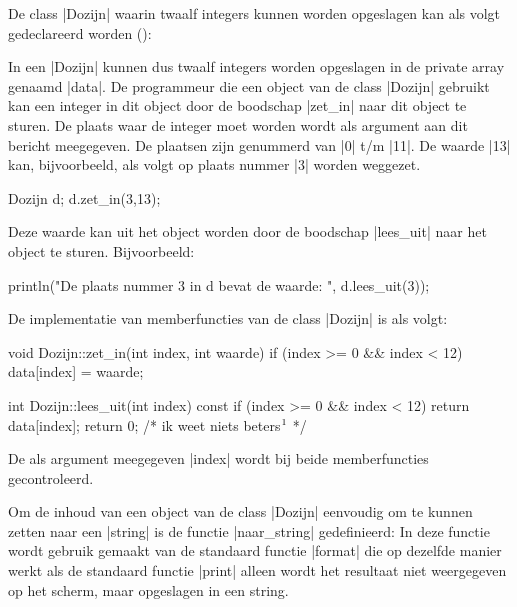 \begin{cpplstShortInline}
De class |Dozijn| waarin twaalf integers kunnen worden opgeslagen kan als volgt gedeclareerd worden ():

In een |Dozijn| kunnen dus twaalf integers worden opgeslagen in de private array genaamd |data|.
De programmeur die een object van de class |Dozijn| gebruikt kan een integer in dit object  door de boodschap |zet_in| naar dit object te sturen.
De plaats waar de integer moet worden  wordt als argument aan dit bericht meegegeven.
De plaatsen zijn genummerd van |0| t/m |11|. 
De waarde |13| kan, bijvoorbeeld, als volgt op plaats nummer |3| worden weggezet.
\begin{cpplstfragment}
    Dozijn d;
    d.zet_in(3,13);
\end{cpplstfragment}

Deze waarde kan uit het object worden  door de boodschap |lees_uit| naar het object te sturen.
Bijvoorbeeld:
\begin{cpplstfragment}
    println("De plaats nummer 3 in d bevat de waarde: {}", d.lees_uit(3));
\end{cpplstfragment}

De implementatie van memberfuncties van de class |Dozijn| is als volgt:
\begin{cpplstfragment}[mathescape=true]
void Dozijn::zet_in(int index, int waarde) {
    if (index >= 0 && index < 12) 
        data[index] = waarde;
}

int Dozijn::lees_uit(int index) const {
    if (index >= 0 && index < 12) 
        return data[index];
    return 0; /* ik weet niets beters$\label{return Dozijn::lees_uit}\footnotemark$ */
}
\end{cpplstfragment}


De als argument meegegeven |index| wordt bij beide memberfuncties gecontroleerd.

Om de inhoud van een object van de class |Dozijn| eenvoudig om te kunnen zetten naar een |string| is de functie |naar_string| gedefinieerd:
In deze functie wordt gebruik gemaakt van de standaard functie |format| die op dezelfde manier werkt als de standaard functie |print| alleen wordt het resultaat niet weergegeven op het scherm, maar opgeslagen in een string.


\end{cpplstShortInline}
